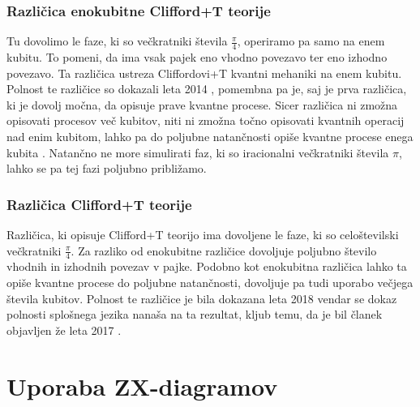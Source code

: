 \documentclass[mat1]{fmfdelo}
\begin{document}
\subsubsection{Različica enokubitne Clifford+T teorije}
Tu dovolimo le faze, ki so večkratniki števila \(\frac\pi4\), operiramo pa samo na enem kubitu. To pomeni, da ima vsak pajek eno vhodno povezavo ter eno izhodno povezavo. Ta različica ustreza Cliffordovi+T kvantni mehaniki na enem kubitu. Polnost te različice so dokazali leta 2014 \cite{backens2014zx}, pomembna pa je, saj je prva različica, ki je dovolj močna, da opisuje prave kvantne procese. Sicer različica ni zmožna opisovati procesov več kubitov, niti ni zmožna točno opisovati kvantnih operacij nad enim kubitom, lahko pa do poljubne natančnosti opiše kvantne procese enega kubita \cite{814621}. Natančno ne more simulirati faz, ki so iracionalni večkratniki števila \(\pi\), lahko se pa tej fazi poljubno približamo.
\subsubsection{Različica Clifford+T teorije}
Različica, ki opisuje Clifford+T teorijo ima dovoljene le faze, ki so celoštevilski večkratniki \(\frac\pi4\). Za razliko od enokubitne različice dovoljuje poljubno število vhodnih in izhodnih povezav v pajke. Podobno kot enokubitna različica lahko ta opiše kvantne procese do poljubne natančnosti, dovoljuje pa tudi uporabo večjega števila kubitov. Polnost te različice je bila dokazana leta 2018 \cite{SimonCompleteness} vendar se dokaz polnosti splošnega jezika nanaša na ta rezultat, kljub temu, da je bil članek objavljen že leta 2017 \cite{kangfengng}.
\section{Uporaba ZX-diagramov}
\end{document}
